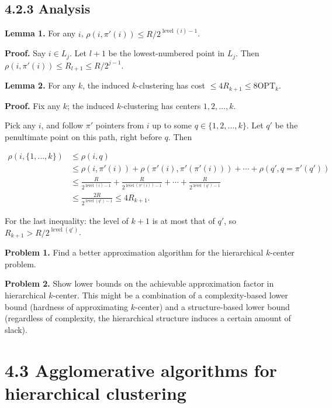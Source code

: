 \documentclass{article}
\begin{document}
\subsection*{4.2.3 Analysis}

\textbf{Lemma 1.} For any $i$, $\rho(i, \pi'(i)) \leq R / 2^{\operatorname{level}(i)-1}$.

\textbf{Proof.} Say $i \in L_{j}$. Let $l+1$ be the lowest-numbered point in $L_{j}$. Then $\rho(i, \pi'(i)) \leq R_{l+1} \leq R / 2^{j-1}$.

\textbf{Lemma 2.} For any $k$, the induced $k$-clustering has cost $\leq 4 R_{k+1} \leq 8 \mathrm{OPT}_{k}$.

\textbf{Proof.} Fix any $k$; the induced $k$-clustering has centers $1, 2, \ldots, k$.

Pick any $i$, and follow $\pi'$ pointers from $i$ up to some $q \in \{1, 2, \ldots, k\}$. Let $q'$ be the penultimate point on this path, right before $q$. Then

\begin{equation*}
\begin{aligned}
\rho(i, \{1, \ldots, k\}) &\leq \rho(i, q) \\
&\leq \rho(i, \pi'(i)) + \rho(\pi'(i), \pi'(\pi'(i))) + \cdots + \rho(q', q = \pi'(q')) \\
&\leq \frac{R}{2^{\operatorname{level}(i)-1}} + \frac{R}{2^{\operatorname{level}(\pi'(i))-1}} + \cdots + \frac{R}{2^{\operatorname{level}(q')-1}} \\
&\leq \frac{2R}{2^{\operatorname{level}(q')-1}} \leq 4 R_{k+1}.
\end{aligned}
\end{equation*}

For the last inequality: the level of $k+1$ is at most that of $q'$, so $R_{k+1} > R / 2^{\operatorname{level}(q')}$.

\textbf{Problem 1.} Find a better approximation algorithm for the hierarchical $k$-center problem.

\textbf{Problem 2.} Show lower bounds on the achievable approximation factor in hierarchical $k$-center. This might be a combination of a complexity-based lower bound (hardness of approximating $k$-center) and a structure-based lower bound (regardless of complexity, the hierarchical structure induces a certain amount of slack).

\section*{4.3 Agglomerative algorithms for hierarchical clustering}
\end{document}
